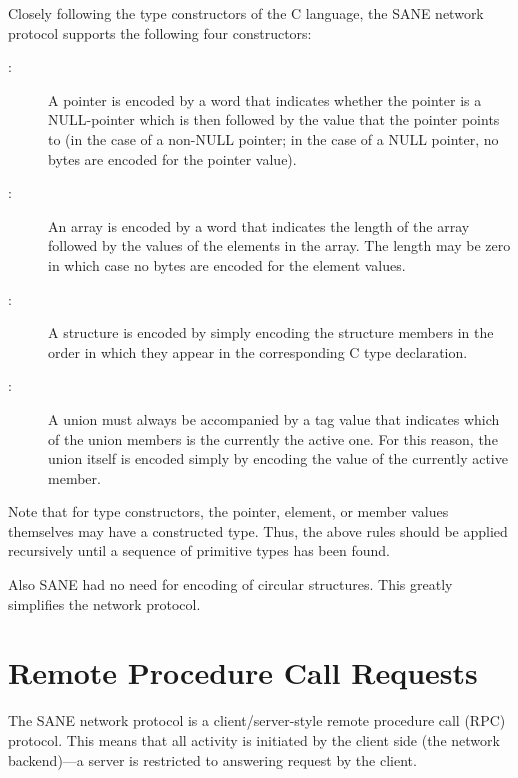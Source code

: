 Closely following the type constructors of the C language, the SANE network
protocol supports the following four constructors:
\begin{description}

\item[{\em{}}:] A pointer is encoded by a word that indicates
  whether the pointer is a NULL-pointer which is then followed by the
  value that the pointer points to (in the case of a non-NULL pointer;
  in the case of a NULL pointer, no bytes are encoded for the pointer
  value).

\item[{\em{}}:] An array is encoded by a word that indicates
  the length of the array followed by the values of the elements in
  the array.  The length may be zero in which case no bytes are
  encoded for the element values.

\item[{\em{}}:] A structure is encoded by simply encoding the
  structure members in the order in which they appear in the
  corresponding C type declaration.

\item[{\em{}}:] A union must always be accompanied by a tag
  value that indicates which of the union members is the currently the
  active one.  For this reason, the union itself is encoded simply by
  encoding the value of the currently active member.

\end{description}

Note that for type constructors, the pointer, element, or member
values themselves may have a constructed type.  Thus, the above rules
should be applied recursively until a sequence of primitive types has
been found.

Also SANE had no need for encoding of circular structures.  This
greatly simplifies the network protocol.

\section{Remote Procedure Call Requests}

The SANE network protocol is a client/server-style remote procedure
call (RPC) protocol.  This means that all activity is initiated by the
client side (the network backend)---a server is restricted to
answering request by the client.

\subsection{}

